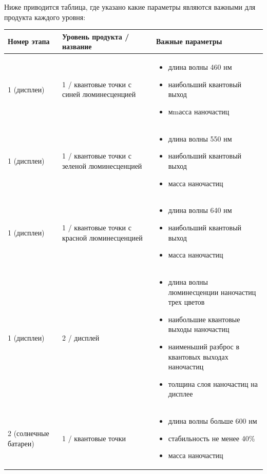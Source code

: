 Ниже приводится таблица, где указано какие параметры являются важными для продукта каждого уровня: 
\begin{table}[H]
	\begin{center}
		\begin{tabular}{|p{2cm}|p{3cm}|p{8cm}|}
			\hline
			Номер этапа	& Уровень продукта / название & Важные параметры \\
			\hline
			1 (дисплеи)	& 1 / квантовые точки с синей люминесценцией	& \begin{itemize}
				\item длина волны 460 \textpm 15 нм
				\item наибольший квантовый выход
				\item мmасса наночастиц
				\end{itemize} \\
				\hline
			1 (дисплеи)	& 1 / квантовые точки с зеленой люминесценцией	& \begin{itemize} \item длина волны 550 \textpm 15 нм
				\item наибольший квантовый выход
				\item масса наночастиц \end{itemize} \\
				\hline
			1 (дисплеи)	&1 / квантовые точки с красной люминесценцией		& \begin{itemize} \item длина волны 640 \textpm 15 нм
				\item наибольший квантовый выход
				\item масса наночастиц \end{itemize} \\
				\hline
			1 (дисплеи)	&2 / дисплей & \begin{itemize} \item длина волны люминесценции наночастиц трех цветов
				\item наибольшие квантовые выходы наночастиц
				\item наименьший разброс в квантовых выходах наночастиц
				\item толщина слоя наночастиц на дисплее \end{itemize} \\
				\hline
			2 (солнечные батареи)	& 1 / квантовые точки		& \begin{itemize} \item длина волны больше 600 нм
				 \item стабильность не менее 40\%
				 \item масса наночастиц \end{itemize} \\

\end{tabular}
\end{center}
\end{table}
